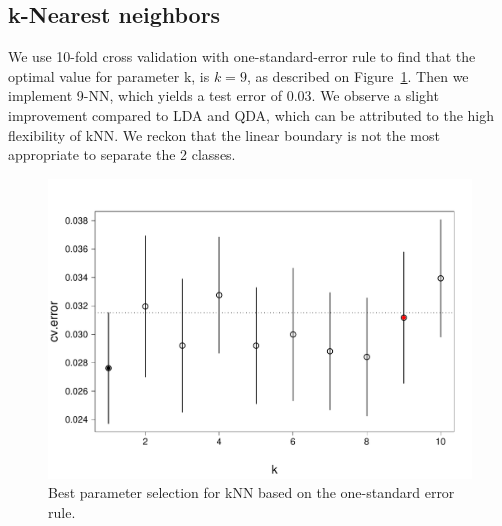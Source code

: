 \subsection{k-Nearest neighbors}
We use \num{10}-fold cross validation with one-standard-error rule to find that the optimal value for parameter k, is $k=9$, as described on Figure~\ref{fig_best_param_CNN}. Then we implement \num{9}-NN, which yields a test error of \num{0.03}. We observe a slight improvement compared to LDA and QDA, which can be attributed to the high flexibility of kNN. We reckon that the linear boundary is not the most appropriate to separate the \num{2} classes.
\begin{figure}[htb]
	\centering
	\includegraphics[height=\BoxPlotFigHeight]{figures/kNN_new.pdf}\hfill%
	\caption{Best parameter selection for kNN based on the one-standard error rule.}
	\label{fig_best_param_CNN}
\end{figure}
